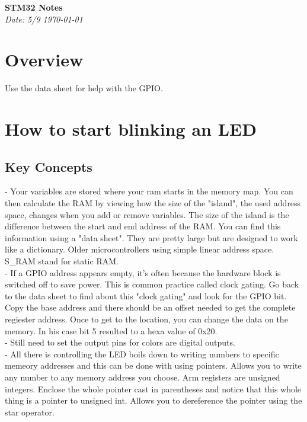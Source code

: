 \documentclass[a4paper,12pt]{article}
\begin{document}
\begin{center}
    {\LARGE \textbf{STM32 Notes}} \\
    \vspace{0.5cm}
    {\large \textit{Date: 5/9 \today}}
\end{center}

\vspace{1cm}

\section*{Overview}
Use the data sheet for help with the GPIO.

\section{How to start blinking an LED}
\subsection{Key Concepts}
- Your variables are stored where your ram starts in the memory map. You can then calculate the RAM by viewing how the size of the "island", the used address space, changes when you add or remove variables. The size of the island is the difference between the start and end address of the RAM.
You can find this information using a "data sheet". They are pretty large but are designed to work like a dictionary.
Older microcontrollers using simple linear address space.
S_RAM stand for static RAM. \\

- If a GPIO address appears empty, it's often because the hardware block is switched off to save power. This is common practice called clock gating. Go back to the data sheet to find about this "clock gating" and look for the GPIO bit.
Copy the base address and there should be an offset needed to get the complete regiester address. 
Once to get to the location, you can change the data on the memory.
In his case bit 5 resulted to a hexa value of 0x20. \\

- Still need to set the output pins for colors are digital outputs. \\

- All there is controlling the LED boils down to writing numbers to specific memeory addresses and this can be done with using pointers.
Allows you to write any number to any memory address you choose.
Arm registers are unsigned integers. Enclose the whole pointer cast in parentheses and notice that this whole thing is a pointer to unsigned int. Allows you to dereference the pointer using the star operator.
\end{document}
